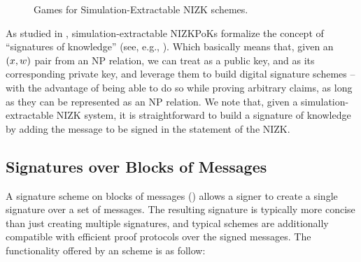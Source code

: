 \begin{figure}[ht!]
\begin{minipage}[t]{0.5\textwidth}
  \end{minipage}
  \label{fig:nizk-games}
  \caption{Games for Simulation-Extractable NIZK schemes.}
\end{figure}

As studied in \cite{cl06}, simulation-extractable NIZKPoKs formalize the concept
of ``signatures of knowledge'' (see, e.g., \cite{cs97}). Which basically means
that, given an $(x,w)$ pair from an NP relation, we can treat \NIZKx
as a public key, and \NIZKw as its corresponding private key, and leverage them
to build digital signature schemes -- with the advantage of being able to do so
while proving arbitrary claims, as long as they can be represented as an NP
relation. We note that, given a simulation-extractable NIZK system, it is
straightforward to build a signature of knowledge by adding the message to be
signed in the statement of the NIZK.

\iffalse
\subsection{Signatures over Blocks of Messages}
\label{sapp:sbm}

A signature scheme on blocks of messages (\SBM) allows a signer to create a
single signature over a set of messages. The resulting signature is typically
more concise than just creating multiple signatures, and typical schemes
\cite{cl02,asm06,ps16} are additionally compatible with efficient proof
protocols over the signed messages. The functionality offered by an \SBM scheme
is as follow:

